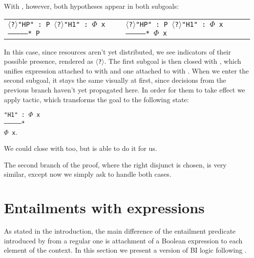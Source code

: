 With , however, both hypotheses appear in both subgoals:

\begin{minipage}[t]{\linewidth}
\begin{tabular}{l l}
  \parbox[t]{0.5\textwidth}{\texttt{$\langle$?$\rangle$"HP" : P\\
  $\langle$?$\rangle$"H1" : $\Phi$ x\\
  ---------------*\\
  P}} &
  \parbox[t]{0.5\textwidth}{\texttt{$\langle$?$\rangle$"HP" : P\\
  $\langle$?$\rangle$"H1" : $\Phi$ x\\
  ---------------*\\
  $\Phi$ x }}
\end{tabular}
\end{minipage}

In this case, since resources aren't yet distributed, we see indicators of their possible presence, rendered as \texttt{$\langle$?$\rangle$}.
The first subgoal is then closed with , which unifies expression attached to  with \true and one attached to  with \false.
When we enter the second subgoal, it stays the same visually at first, since decisions from the previous branch haven't yet propagated here.
In order for them to take effect we apply  tactic, which transforms the goal to the following state:

\begin{minipage}[t]{\linewidth}
\texttt{"H1" : $\Phi$ x\\
---------------*\\
$\Phi$ x}.
\end{minipage}

We could close with  too, but  is able to do it for us.

The second branch of the proof, where the right disjunct is chosen, is very similar, except now we simply ask  to handle both cases.

\section{Entailments with expressions}

As stated in the introduction, the main difference of the entailment predicate introduced by \citet{harlandResourceDistributionBooleanConstraints2003} from a regular one is attachment of a Boolean expression to each element of the context.
In this section we present a version of BI logic following \citet{harlandResourceDistributionBooleanConstraints2003}.

